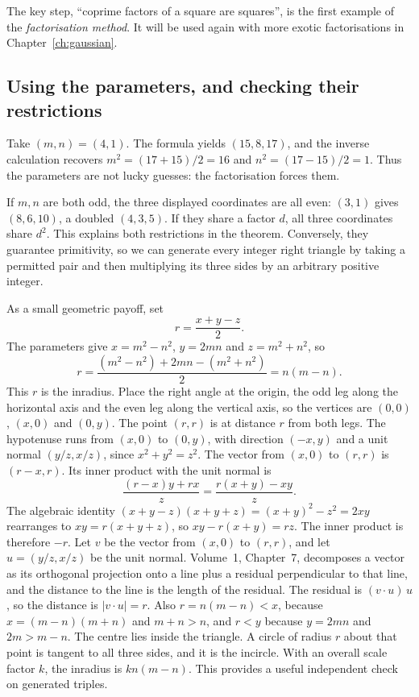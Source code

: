 The key step, ``coprime factors of a square are squares'', is the first example of the \emph{factorisation method}. It will be used again with more exotic factorisations in Chapter~\ref{ch:gaussian}.

\subsection*{Using the parameters, and checking their restrictions}
Take $(m,n)=(4,1)$. The formula yields $(15,8,17)$, and the inverse calculation recovers $m^2=(17+15)/2=16$ and $n^2=(17-15)/2=1$. Thus the parameters are not lucky guesses: the factorisation forces them.

If $m,n$ are both odd, the three displayed coordinates are all even: $(3,1)$ gives $(8,6,10)$, a doubled $(4,3,5)$. If they share a factor $d$, all three coordinates share $d^2$. This explains both restrictions in the theorem. Conversely, they guarantee primitivity, so we can generate every integer right triangle by taking a permitted pair and then multiplying its three sides by an arbitrary positive integer.

As a small geometric payoff, set
\[
r=\frac{x+y-z}{2}.
\]
The parameters give $x=m^2-n^2$, $y=2mn$ and $z=m^2+n^2$, so
\[
r=\frac{(m^2-n^2)+2mn-(m^2+n^2)}{2}=n(m-n).
\]
This $r$ is the inradius. Place the right angle at the origin, the odd leg along the horizontal axis and the even leg along the vertical axis, so the vertices are $(0,0)$, $(x,0)$ and $(0,y)$. The point $(r,r)$ is at distance $r$ from both legs. The hypotenuse runs from $(x,0)$ to $(0,y)$, with direction $(-x,y)$ and a unit normal $(y/z,x/z)$, since $x^2+y^2=z^2$. The vector from $(x,0)$ to $(r,r)$ is $(r-x,r)$. Its inner product with the unit normal is
\[
\frac{(r-x)y+rx}{z}=\frac{r(x+y)-xy}{z}.
\]
The algebraic identity $(x+y-z)(x+y+z)=(x+y)^2-z^2=2xy$ rearranges to $xy=r(x+y+z)$, so $xy-r(x+y)=rz$. The inner product is therefore $-r$. Let $v$ be the vector from $(x,0)$ to $(r,r)$, and let $u=(y/z,x/z)$ be the unit normal. Volume~1, Chapter~7, decomposes a vector as its orthogonal projection onto a line plus a residual perpendicular to that line, and the distance to the line is the length of the residual. The residual is $(v\cdot u)\,u$, so the distance is $|v\cdot u|=r$. Also $r=n(m-n)<x$, because $x=(m-n)(m+n)$ and $m+n>n$, and $r<y$ because $y=2mn$ and $2m>m-n$. The centre lies inside the triangle. A circle of radius $r$ about that point is tangent to all three sides, and it is the incircle. With an overall scale factor $k$, the inradius is $kn(m-n)$. This provides a useful independent check on generated triples.

